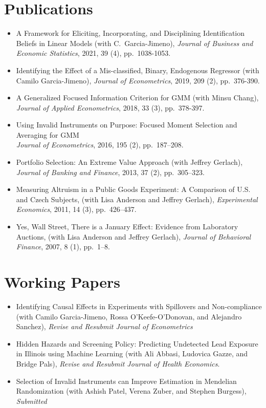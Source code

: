 \documentclass[line,overlapped]{myres}
\begin{document}
\begin{resume}
\section{\sc Publications}
\begin{itemize}
  \item A Framework for Eliciting, Incorporating, and Disciplining Identification Beliefs in Linear Models (with C.\ Garcia-Jimeno), \emph{Journal of Business and Economic Statistics}, 2021, 39 (4), pp.\ 1038-1053.
  \item Identifying the Effect of a Mis-classified, Binary, Endogenous Regressor (with Camilo Garcia-Jimeno), \emph{Journal of Econometrics}, 2019, 209 (2), pp.\ 376-390.
  \item A Generalized Focused Information Criterion for GMM (with Minsu Chang), \emph{Journal of Applied Econometrics}, 2018, 33 (3), pp.\ 378-397.
  \item Using Invalid Instruments on Purpose: Focused Moment Selection and Averaging for GMM\\ \emph{Journal of Econometrics}, 2016, 195 (2), pp.\ 187--208.
	\item Portfolio Selection: An Extreme Value Approach (with Jeffrey Gerlach), \emph{Journal of Banking and Finance}, 2013, 37 (2), pp.\ 305--323.
	\item Measuring Altruism in a Public Goods Experiment:  A Comparison of U.S. and Czech Subjects, (with Lisa Anderson and Jeffrey Gerlach), \emph{Experimental Economics}, 2011, 14 (3), pp.\ 426--437.
	\item Yes, Wall Street, There is a January Effect: Evidence from Laboratory Auctions, (with Lisa Anderson and Jeffrey Gerlach), \emph{Journal of Behavioral Finance}, 2007, 8 (1), pp.\ 1--8. 
\end{itemize}


\section{\sc Working Papers}
\begin{itemize}
  \item Identifying Causal Effects in Experiments with Spillovers and Non-compliance (with Camilo Garcia-Jimeno, Rossa O'Keefe-O'Donovan, and Alejandro Sanchez), \emph{Revise and Resubmit Journal of Econometrics}
  \item Hidden Hazards and Screening Policy: Predicting Undetected Lead Exposure in Illinois using Machine Learning (with Ali Abbasi, Ludovica Gazze, and Bridge Pals), \emph{Revise and Resubmit Journal of Health Economics}.
  \item Selection of Invalid Instruments can Improve Estimation in Mendelian Randomization (with Ashish Patel, Verena Zuber, and Stephen Burgess), \emph{Submitted}
\end{itemize}



\end{resume}
\end{document}
